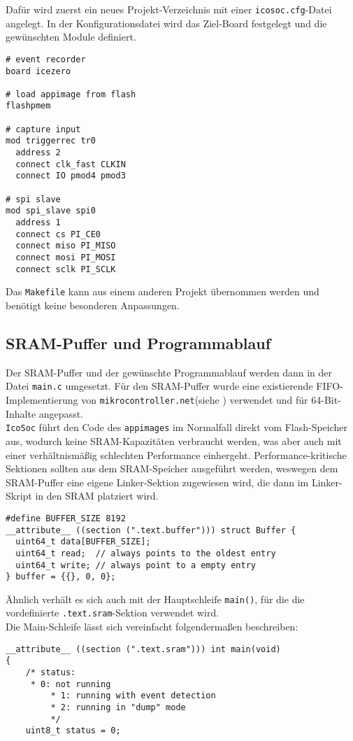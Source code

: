 {Dafür wird zuerst ein neues Projekt-Verzeichnis mit einer {\tt icosoc.cfg}-Datei angelegt. In der Konfigurationsdatei wird das Ziel-Board festgelegt und die gewünschten Module definiert.
\begin{verbatim}
# event recorder 
board icezero

# load appimage from flash
flashpmem

# capture input
mod triggerrec tr0
  address 2
  connect clk_fast CLKIN
  connect IO pmod4 pmod3

# spi slave
mod spi_slave spi0
  address 1
  connect cs PI_CE0
  connect miso PI_MISO
  connect mosi PI_MOSI
  connect sclk PI_SCLK
\end{verbatim}

Das {\tt Makefile} kann aus einem anderen Projekt übernommen werden und benötigt keine besonderen Anpassungen.\\

\subsection{SRAM-Puffer und Programmablauf}

Der SRAM-Puffer und der gewünschte Programmablauf werden dann in der Datei {\tt main.c} umgesetzt.
Für den SRAM-Puffer wurde eine existierende FIFO-Implementierung von {\tt mikrocontroller.net}(siehe \cite{web:mikro_fifo}) verwendet und für 64-Bit-Inhalte angepasst.\\
{\tt IcoSoc} führt den Code des {\tt appimages} im Normalfall direkt vom Flash-Speicher aus, wodurch keine SRAM-Kapazitäten verbraucht werden, was aber auch mit einer verhältnismäßig schlechten Performance einhergeht. Performance-kritische Sektionen sollten aus dem SRAM-Speicher ausgeführt werden, weswegen dem SRAM-Puffer eine eigene Linker-Sektion zugewiesen wird, die dann im Linker-Skript in den SRAM platziert wird.
\begin{verbatim}
#define BUFFER_SIZE 8192 
__attribute__ ((section (".text.buffer"))) struct Buffer {
  uint64_t data[BUFFER_SIZE];
  uint64_t read;  // always points to the oldest entry
  uint64_t write; // always point to a empty entry
} buffer = {{}, 0, 0};
\end{verbatim}
 
Ähnlich verhält es sich auch mit der Hauptschleife {\tt main()}, für die die vordefinierte {\tt .text.sram}-Sektion verwendet wird.\\
Die Main-Schleife lässt sich vereinfacht folgendermaßen beschreiben:
\begin{verbatim}
__attribute__ ((section (".text.sram"))) int main(void) 
{
	/* status:
	 * 0: not running
         * 1: running with event detection
         * 2: running in "dump" mode
         */
	uint8_t status = 0; 
	

\end{verbatim}}
